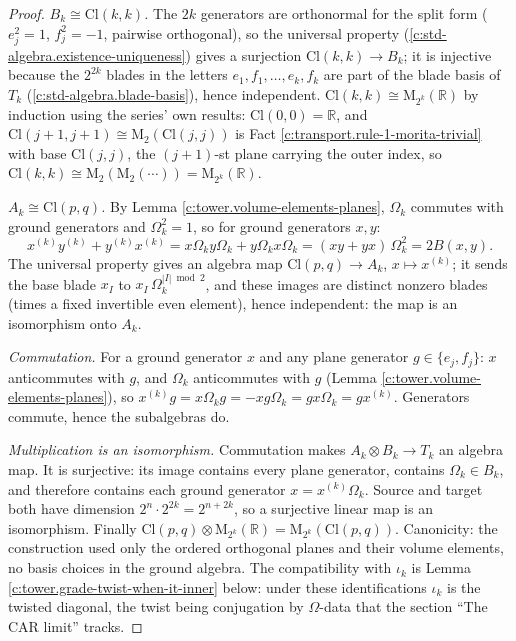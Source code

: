 \documentclass[11pt]{article}
\theoremstyle{definition}
\theoremstyle{plain}
\providecommand{\Cl}{}\renewcommand{\Cl}{\mathrm{Cl}}
\providecommand{\Mat}{}\renewcommand{\Mat}{\mathrm{M}}
\providecommand{\R}{}\renewcommand{\R}{\mathbb{R}}
\begin{document}
\begin{proof}
\emph{$B_k \cong \Cl(k,k)$.} The $2k$ generators are orthonormal for the split form ($e_j^2 = 1$, $f_j^2 = -1$, pairwise orthogonal), so the universal property (\ref{c:std-algebra.existence-uniqueness}) gives a surjection $\Cl(k,k) \to B_k$; it is injective because the $2^{2k}$ blades in the letters $e_1, f_1, \dots, e_k, f_k$ are part of the blade basis of $T_k$ (\ref{c:std-algebra.blade-basis}), hence independent. \emph{$\Cl(k,k) \cong \Mat_{2^k}(\R)$} by induction using the series' own results: $\Cl(0,0) = \R$, and $\Cl(j{+}1,j{+}1) \cong \Mat_2(\Cl(j,j))$ is Fact \ref{c:transport.rule-1-morita-trivial} with base $\Cl(j,j)$, the $(j{+}1)$-st plane carrying the outer index, so $\Cl(k,k) \cong \Mat_2(\Mat_2(\cdots)) = \Mat_{2^k}(\R)$.

\emph{$A_k \cong \Cl(p,q)$.} By Lemma \ref{c:tower.volume-elements-planes}, $\Omega_k$ commutes with ground generators and $\Omega_k^2 = 1$, so for ground generators $x, y$:
\[
x^{(k)} y^{(k)} + y^{(k)} x^{(k)} = x \Omega_k y \Omega_k + y \Omega_k x \Omega_k = (xy + yx)\,\Omega_k^2 = 2B(x,y) .
\]
The universal property gives an algebra map $\Cl(p,q) \to A_k$, $x \mapsto x^{(k)}$; it sends the base blade $x_I$ to $x_I\,\Omega_k^{|I| \bmod 2}$, and these images are distinct nonzero blades (times a fixed invertible even element), hence independent: the map is an isomorphism onto $A_k$.

\emph{Commutation.} For a ground generator $x$ and any plane generator $g \in \{e_j, f_j\}$: $x$ anticommutes with $g$, and $\Omega_k$ anticommutes with $g$ (Lemma \ref{c:tower.volume-elements-planes}), so $x^{(k)} g = x \Omega_k g = -x g \Omega_k = g x \Omega_k = g x^{(k)}$. Generators commute, hence the subalgebras do.

\emph{Multiplication is an isomorphism.} Commutation makes $A_k \otimes B_k \to T_k$ an algebra map. It is surjective: its image contains every plane generator, contains $\Omega_k \in B_k$, and therefore contains each ground generator $x = x^{(k)} \Omega_k$. Source and target both have dimension $2^n \cdot 2^{2k} = 2^{n + 2k}$, so a surjective linear map is an isomorphism. Finally $\Cl(p,q) \otimes \Mat_{2^k}(\R) = \Mat_{2^k}(\Cl(p,q))$. Canonicity: the construction used only the ordered orthogonal planes and their volume elements, no basis choices in the ground algebra. The compatibility with $\iota_k$ is Lemma \ref{c:tower.grade-twist-when-it-inner} below: under these identifications $\iota_k$ is the twisted diagonal, the twist being conjugation by $\Omega$-data that the section ``The CAR limit'' tracks.

\end{proof}
\end{document}
